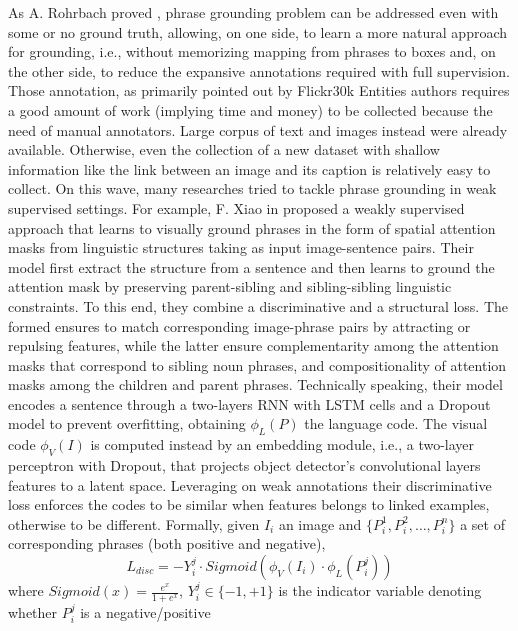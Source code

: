 As A. Rohrbach \etal{} proved \cite{rohrbach2016grounding}, phrase
grounding problem can be addressed even with some or no ground truth,
allowing, on one side, to learn a more natural approach for grounding,
i.e., without memorizing mapping from phrases to boxes and, on the
other side, to reduce the expansive annotations required with full
supervision. Those annotation, as primarily pointed out by Flickr30k
Entities authors \cite{plummer2015flickr30k} requires a good amount of
work (implying time and money) to be collected because the need of
manual annotators. Large corpus of text and images instead were
already available. Otherwise, even the collection of a new dataset
with shallow information like the link between an image and its
caption is relatively easy to collect. On this wave, many researches
tried to tackle phrase grounding in weak supervised settings. For
example, F. Xiao \etal{} in \cite{xiao2017weakly} proposed a weakly
supervised approach that learns to visually ground phrases in the form
of spatial attention masks from linguistic structures taking as input
image-sentence pairs. Their model first extract the structure from a
sentence and then learns to ground the attention mask by preserving
parent-sibling and sibling-sibling linguistic constraints. To this
end, they combine a discriminative and a structural loss. The formed
ensures to match corresponding image-phrase pairs by attracting or
repulsing features, while the latter ensure complementarity among the
attention masks that correspond to sibling noun phrases, and
compositionality of attention masks among the children and parent
phrases. Technically speaking, their model encodes a sentence through
a two-layers RNN with LSTM cells and a Dropout model to prevent
overfitting, obtaining $\phi_L(P)$ the language code. The visual code
$\phi_V(I)$ is computed instead by an embedding module, i.e., a
two-layer perceptron with Dropout, that projects object detector's
convolutional layers features to a latent space. Leveraging on weak
annotations their discriminative loss enforces the codes to be similar
when features belongs to linked examples, otherwise to be different.
Formally, given $I_i$ an image and $\{ P^1_i, P^2_i, \ldots, P^n_i \}$
a set of corresponding phrases (both positive and negative), 
\begin{equation}
  L_{disc} = -Y^j_i \cdot Sigmoid(\phi_V(I_i) \cdot \phi_L(P^j_i))
\end{equation}
where $Sigmoid(x) = \frac{e^x}{1 + e^x}$, $Y^j_i \in \{ -1, +1 \}$ is
the indicator variable denoting whether $P^j_i$ is a negative/positive
